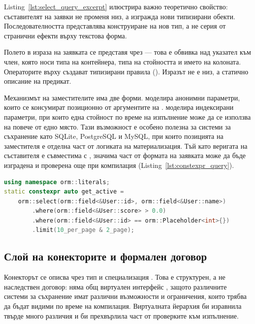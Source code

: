 Listing~\ref{lst:select_query_excerpt} илюстрира важно теоретично свойство: съставителят на заявки не променя низ, а изгражда нови типизирани обекти. Последователността  представлява конструиране на нов тип, а не серия от странични ефекти върху текстова форма.

Полето в израза на заявката се представя чрез  --- това е  обвивка над указател към член, която носи типа на контейнера, типа на стойността и името на колоната. Операторите върху  създават типизирани правила (). Изразът  не е низ, а статично описание на предикат.

Механизмът на заместителите има две форми.  моделира анонимни параметри, които се консумират позиционно от аргументите на .  моделира индексирани параметри, при които една стойност по време на изпълнение може да се използва на повече от едно място. Тази възможност е особено полезна за системи за съхранение като SQLite, PostgreSQL и MySQL, при които позицията на заместителя е отделна част от логиката на материализация. Тъй като веригата на съставителя е съвместима с , значима част от формата на заявката може да бъде изградена и проверена още при компилация (Listing~\ref{lst:constexpr_query}).

\begin{lstlisting}[language=C++,caption={Заявка декларирана като константа, изчислима при компилация},label={lst:constexpr_query}]
using namespace orm::literals;
static constexpr auto get_active =
    orm::select(orm::field<&User::id>, orm::field<&User::name>)
        .where(orm::field<&User::score> > 0.0)
        .where(orm::field<&User::id> == orm::Placeholder<int>{})
        .limit(10_per_page & 2_page);
\end{lstlisting}

\subsection{Слой на конекторите и формален договор}
\label{subsec:connector_contract}

Конекторът се описва чрез тип  и специализация . Това е структурен, а не наследствен договор: няма общ виртуален интерфейс , защото различните системи за съхранение имат различни възможности и ограничения, които трябва да бъдат видими по време на компилация. Виртуалната йерархия би изравнила твърде много различия и би прехвърлила част от проверките към изпълнение.

